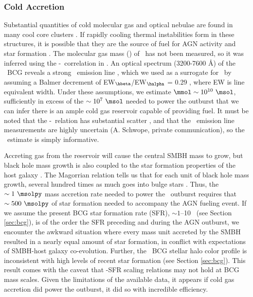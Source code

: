 \documentclass[iop]{emulateapj-rtx4}
\begin{document}
\subsubsection{Cold Accretion}
\label{sec:cold}

Substantial quantities of cold molecular gas and optical nebulae are
found in many cool core clusters \citep{crawford99, edge01}. If
rapidly cooling thermal instabilities form in these structures, it is
possible that they are the source of fuel for AGN activity and star
formation \citep[\eg][]{pizzolato05, 2010MNRAS.408..961P}. The
molecular gas mass (\mmol) of \rbs\ has not been measured, so it was
inferred using the \mmol-\halpha\ correlation in \citet{edge01}. An
optical spectrum (3200-7600 \AA) of the \rbs\ BCG reveals a strong
\hbeta\ emission line \citep{rbs1, rbs2}, which we used as a surrogate
for \halpha\ by assuming a Balmer decrement of
EW$_{\hbeta}$/EW$_{\halpha}$ = 0.29 \citep{2006ApJ...642..775M}, where
EW is line equivalent width. Under these assumptions, we estimate
$\mmol \sim 10^{10} ~\msol$, sufficiently in excess of the $\sim 10^7
~\msol$ needed to power the outburst that we can infer there is an
ample cold gas reservoir capable of providing fuel. It must be noted
that the \mmol-\halpha\ relation has substantial scatter
\citep{salome03}, and that the \rbs\ emission line measurements are
highly uncertain (A. Schwope, private communication), so the
\mmol\ estimate is simply informative.

Accreting gas from the reservoir will cause the central SMBH mass to
grow, but black hole mass growth is also coupled to the star formation
properties of the host galaxy \citep[\eg][]{1995ARA&A..33..581K,
  2000ApJ...539L...9F}. The Magorrian relation \citep{magorrian} tells
us that for each unit of black hole mass growth, several hundred times
as much goes into bulge stars
\citep[\eg][]{2004ApJ...604L..89H}. Thus, the $\sim 1 ~\msolpy$ mass
accretion rate needed to power the \rbs\ outburst requires that $\sim
500 ~\msolpy$ of star formation needed to accompany the AGN fueling
event. If we assume the present BCG star formation rate (SFR), $\sim
1$--10 \msolpy\ (see Section \ref{sec:bcg}), is of the order the SFR
preceding and during the AGN outburst, we encounter the awkward
situation where every mass unit accreted by the SMBH resulted in a
nearly equal amount of star formation, in conflict with expectations
of SMBH-host galaxy co-evolution. Further, the \rbs\ BCG stellar halo
color profile is inconsistent with high levels of recent star
formation (see Section \ref{sec:bcg}). This result comes with the
caveat that \mbh-SFR scaling relations may not hold at BCG mass
scales. Given the limitations of the available data, it appears if
cold gas accretion did power the outburst, it did so with incredible
efficiency.
\end{document}
